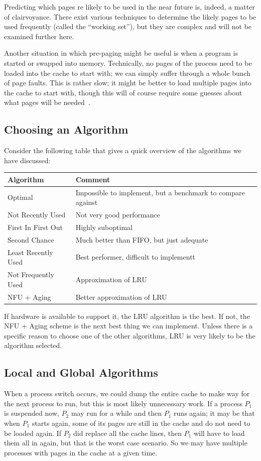 Predicting which pages re likely to be used in the near future is, indeed, a matter of clairvoyance. There exist various techniques to determine the likely pages to be used frequently (called the ``working set''), but they are complex and will not be examined further here.

Another situation in which pre-paging might be useful is when a program is started or swapped into memory. Technically, no pages of the process need to be loaded into the cache to start with; we can simply suffer through a whole bunch of page faults. This is rather slow; it might be better to load multiple pages into the cache to start with, though this will of course require some guesses about what pages will be needed~\cite{mos}.

\subsection*{Choosing an Algorithm}
Consider the following table that gives a quick overview of the algorithms we have discussed:

\begin{center}
\begin{tabular}{l|l}
	\textbf{Algorithm} & \textbf{Comment} \\ \hline
	Optimal & Impossible to implement, but a benchmark to compare against\\
	Not Recently Used &  Not very good performance \\
	First In First Out & Highly suboptimal \\
	Second Chance & Much better than FIFO, but just adequate \\
	Least Recently Used & Best performer, difficult to implementt \\
	Not Frequently Used & Approximation of LRU \\
	NFU + Aging & Better approximation of LRU\\
\end{tabular}
\end{center}

If hardware is available to support it, the LRU algorithm is the best. If not, the NFU + Aging scheme is the next best thing we can implement. Unless there is a specific reason to choose one of the other algorithms, LRU is very likely to be the algorithm selected.

\subsection*{Local and Global Algorithms}
When a process switch occurs, we could dump the entire cache to make way for the next process to run, but this is most likely unnecessary work. If a process $P_{1}$ is suspended now, $P_{2}$ may run for a while and then $P_{1}$ runs again; it may be that when $P_{1}$ starts again, some of its pages are still in the cache and do not need to be loaded again. If $P_{2}$ did replace all the cache lines, then $P_{1}$ will have to load them all in again, but that is the worst case scenario. So we may have multiple processes with pages in the cache at a given time.

